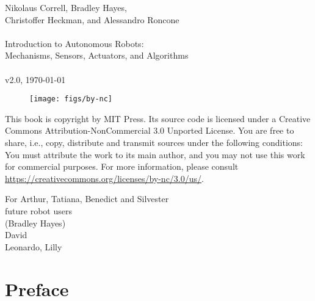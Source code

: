 \documentclass[paper=6.14in:9.21in,pagesize=pdftex,11pt,twoside,openright]{scrbook}
\begin{document}


\thispagestyle{empty}
\begin{flushleft}
Nikolaus Correll, Bradley Hayes,\\ Christoffer Heckman, and Alessandro Roncone \\~\\
Introduction to Autonomous Robots:\\ Mechanisms, Sensors, Actuators, and Algorithms\\~\\
v2.0, \today\\
\end{flushleft}

\vfill

\begin{figure}[!h]
\texttt{[image: figs/by-nc]}
\end{figure}

This book is copyright by MIT Press. Its source code is licensed under a Creative Commons Attribution-NonCommercial 3.0 Unported License. You are free to share, i.e., copy, distribute and transmit sources under the following conditions: You must attribute the work to its main author, and you may not use this work for commercial purposes. For more information, please consult \url{https://creativecommons.org/licenses/by-nc/3.0/us/}.

\cleardoublepage
\thispagestyle{empty}
\vspace*{\fill}
\begin{center}
For Arthur, Tatiana, Benedict and Silvester\\
future robot users\\
(Bradley Hayes)
\\
David
\\
Leonardo, Lilly
\end{center}
\vspace*{\fill}

\tableofcontents

\chapter*{Preface}
\end{document}
